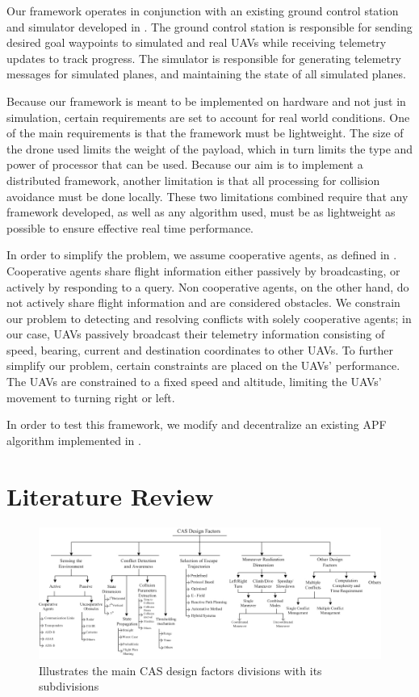 \documentclass[conference]{IEEEtran}
\begin{document}
Our framework operates in conjunction with an existing ground control station and simulator developed in \cite{holt2012comparison}. The ground control station is responsible for sending desired goal waypoints to simulated and real UAVs while receiving telemetry updates to track progress. The simulator is responsible for generating telemetry messages for simulated planes, and maintaining the state of all simulated planes. 

Because our framework is meant to be implemented on hardware and not just in simulation, certain requirements are set to account for real world conditions. One of the main requirements is that the framework must be lightweight. The size of the drone used limits the weight of the payload, which in turn limits the type and power of processor that can be used. Because our aim is to implement a distributed framework, another limitation is that all processing for collision avoidance must be done locally. These two limitations combined require that any framework developed, as well as any algorithm used, must be as lightweight as possible to ensure effective real time performance.

In order to simplify the problem, we assume cooperative agents, as defined in \cite{roadmap2002roadmap}. Cooperative agents share flight information either passively by broadcasting, or actively by responding to a query. Non cooperative agents, on the other hand, do not actively share flight information and are considered obstacles. We constrain our problem to detecting and resolving conflicts with solely cooperative agents; in our case, UAVs passively broadcast their telemetry information consisting of speed, bearing, current and destination coordinates to other UAVs. To further simplify our problem, certain constraints are placed on the UAVs' performance.  The UAVs are constrained to a fixed speed and altitude, limiting the UAVs' movement to turning right or left. 

In order to test this framework, we modify and decentralize an existing APF algorithm implemented in \cite{siudynamic}.


\section{Literature Review}
\label{sec:litReview}

\begin{figure}
	\includegraphics [width=1\textwidth] {09Rahim}
	\caption{Illustrates the main CAS design factors divisions with its subdivisions \cite{albaker2009survey}}
	\label{fig:09Rahim}
\end{figure}
\end{document}

